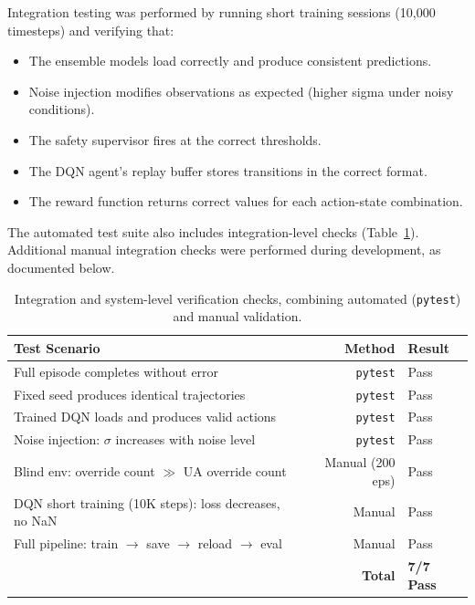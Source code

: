 \documentclass[12pt,a4paper]{report}
\begin{document}
Integration testing was performed by running short training sessions (10,000 timesteps) and verifying that:

\begin{itemize}
    \item The ensemble models load correctly and produce consistent predictions.
    \item Noise injection modifies observations as expected (higher sigma under noisy conditions).
    \item The safety supervisor fires at the correct thresholds.
    \item The DQN agent's replay buffer stores transitions in the correct format.
    \item The reward function returns correct values for each action-state combination.
\end{itemize}

The automated test suite also includes integration-level checks (Table~\ref{tab:integration_test_results}). Additional manual integration checks were performed during development, as documented below.

\begin{table}[h]
\centering
\small
\caption{Integration and system-level verification checks, combining automated (\texttt{pytest}) and manual validation.}
\label{tab:integration_test_results}
\renewcommand{\arraystretch}{1.3}
\begin{tabular}{lrl}
\toprule
\textbf{Test Scenario} & \textbf{Method} & \textbf{Result} \\
\midrule
Full episode completes without error & \texttt{pytest} & Pass \\
Fixed seed produces identical trajectories & \texttt{pytest} & Pass \\
Trained DQN loads and produces valid actions & \texttt{pytest} & Pass \\
Noise injection: $\sigma$ increases with noise level & \texttt{pytest} & Pass \\
Blind env: override count $\gg$ UA override count & Manual (200 eps) & Pass \\
DQN short training (10K steps): loss decreases, no NaN & Manual & Pass \\
Full pipeline: train $\rightarrow$ save $\rightarrow$ reload $\rightarrow$ eval & Manual & Pass \\
\midrule
\multicolumn{2}{r}{\textbf{Total}} & \textbf{7/7 Pass} \\
\bottomrule
\end{tabular}
\end{table}
\end{document}

